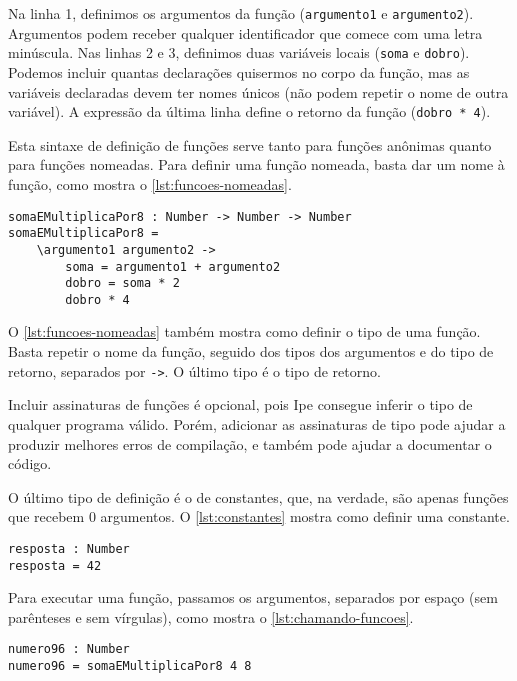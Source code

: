 Na linha 1, definimos os argumentos da função (\texttt{argumento1} e \texttt{argumento2}).
Argumentos podem receber qualquer identificador que comece com uma letra minúscula.
Nas linhas 2 e 3, definimos duas variáveis locais (\texttt{soma} e \texttt{dobro}).
Podemos incluir quantas declarações quisermos no corpo da função, mas as variáveis
declaradas devem ter nomes únicos (não podem repetir o nome de outra variável). A
expressão da última linha define o retorno da função (\texttt{dobro * 4}).

Esta sintaxe de definição de funções serve tanto para funções anônimas quanto para
funções nomeadas. Para definir uma função nomeada, basta dar um nome à função, como
mostra o \autoref{lst:funcoes-nomeadas}.

\begin{lstlisting}[label={lst:funcoes-nomeadas},caption={Exemplo de como definir uma função nomeada}]
somaEMultiplicaPor8 : Number -> Number -> Number
somaEMultiplicaPor8 =
    \argumento1 argumento2 ->
        soma = argumento1 + argumento2
        dobro = soma * 2
        dobro * 4
\end{lstlisting}

O \autoref{lst:funcoes-nomeadas} também mostra como definir o tipo de uma função.
Basta repetir o nome da função, seguido dos tipos dos argumentos e do tipo de retorno,
separados por \texttt{->}. O último tipo é o tipo de retorno.

Incluir assinaturas de funções é opcional, pois Ipe consegue inferir o tipo de
qualquer programa válido. Porém, adicionar as assinaturas de tipo pode ajudar a
produzir melhores erros de compilação, e também pode ajudar a documentar o código.

O último tipo de definição é o de constantes, que, na verdade, são apenas funções
que recebem 0 argumentos. O \autoref{lst:constantes} mostra como definir uma constante.

\begin{lstlisting}[label={lst:constantes},caption={Exemplo de como definir uma constante}]
resposta : Number
resposta = 42
\end{lstlisting}

Para executar uma função, passamos os argumentos, separados por espaço (sem parênteses
e sem vírgulas), como mostra o \autoref{lst:chamando-funcoes}.

\begin{lstlisting}[label={lst:chamando-funcoes},caption={Exemplo de como chamar uma função}]
numero96 : Number
numero96 = somaEMultiplicaPor8 4 8
\end{lstlisting}

